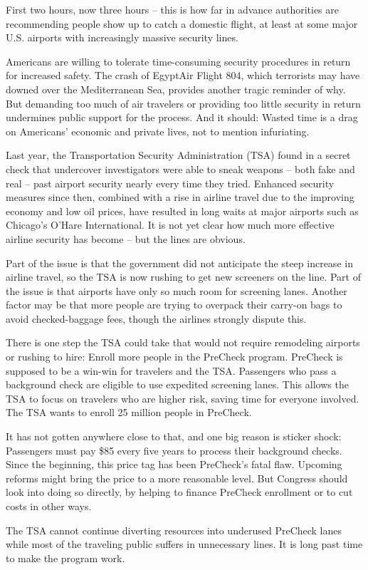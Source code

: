 First two hours, now three hours – this is how far in advance authorities are recommending people show up to catch a domestic flight, at least at some major U.S. airports with increasingly massive security lines.


Americans are willing to tolerate time-consuming security procedures in return for increased safety. The crash of EgyptAir Flight 804, which terrorists may have downed over the Mediterranean Sea, provides another tragic reminder of why. But demanding too much of air travelers or providing too little security in return undermines public support for the process. And it should: Wasted time is a drag on Americans' economic and private lives, not to mention infuriating.


Last year, the Transportation Security Administration (TSA) found in a secret check that undercover investigators were able to sneak weapons – both fake and real – past airport security nearly every time they tried. Enhanced security measures since then, combined with a rise in airline travel due to the improving economy and low oil prices, have resulted in long waits at major airports such as Chicago's O'Hare International. It is not yet clear how much more effective airline security has become – but the lines are obvious.


Part of the issue is that the government did not anticipate the steep increase in airline travel, so the TSA is now rushing to get new screeners on the line. Part of the issue is that airports have only so much room for screening lanes. Another factor may be that more people are trying to overpack their carry-on bags to avoid checked-baggage fees, though the airlines strongly dispute this.


There is one step the TSA could take that would not require remodeling airports or rushing to hire: Enroll more people in the PreCheck program. PreCheck is supposed to be a win-win for travelers and the TSA. Passengers who pass a background check are eligible to use expedited screening lanes. This allows the TSA to focus on travelers who are higher risk, saving time for everyone involved. The TSA wants to enroll 25 million people in PreCheck.


It has not gotten anywhere close to that, and one big reason is sticker shock: Passengers must pay \$85 every five years to process their background checks. Since the beginning, this price tag has been PreCheck's fatal flaw. Upcoming reforms might bring the price to a more reasonable level. But Congress should look into doing so directly, by helping to finance PreCheck enrollment or to cut costs in other ways.


The TSA cannot continue diverting resources into underused PreCheck lanes while most of the traveling public suffers in unnecessary lines. It is long past time to make the program work.